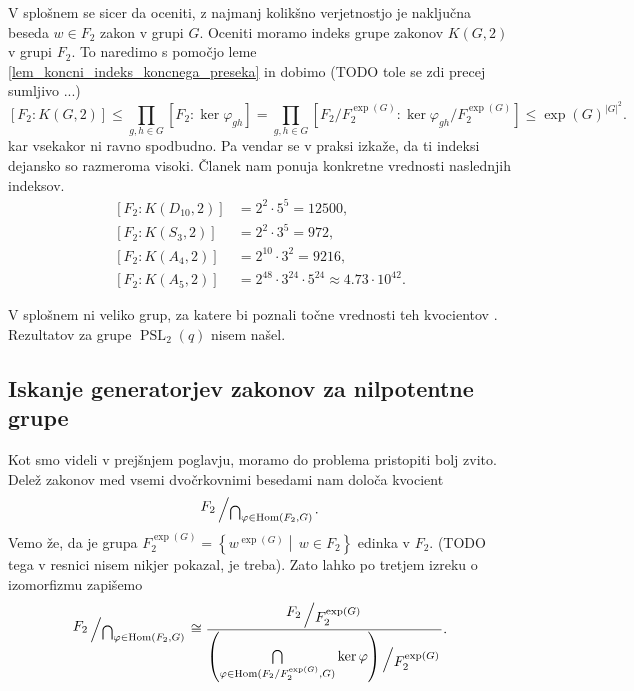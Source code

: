 \documentclass[mat1, tisk]{fmfdelo}
\newcommand{\bigslant}[2]{{\raisebox{.2em}{$#1$}\left/\raisebox{-.2em}{$#2$}\right.}}
\numberwithin{equation}{section}  %
\begin{document}
V splošnem se sicer da oceniti, z najmanj kolikšno verjetnostjo je naključna beseda $w \in F_2$ zakon v grupi $G$.
Oceniti moramo indeks grupe zakonov $K(G, 2)$ v grupi $F_2$. To naredimo s pomočjo leme \ref{lem_koncni_indeks_koncnega_preseka} in dobimo (TODO tole se zdi precej sumljivo ...)
\begin{equation*}
\left[ F_2 : K(G, 2) \right] \le \prod_{g, h \in G} [F_2 : \ker \varphi_{gh}] = \prod_{g, h \in G} [F_2 / F_2^{\exp(G)} : \ker \varphi_{gh}  / F_2^{\exp(G)}] \le {\exp(G)}^{\lvert G \rvert^2}.
\end{equation*}  
kar vsekakor ni ravno spodbudno. Pa vendar se v praksi izkaže, da ti indeksi dejansko so razmeroma visoki. Članek \cite{Cocke_2020} nam ponuja konkretne vrednosti naslednjih indeksov.
\begin{align*}
    \left[ F_2 : K(D_{10}, 2) \right] &= 2^2 \cdot 5^{5} = 12500, \\
    \left[ F_2 : K(S_3, 2) \right] &= 2^2 \cdot 3^{5} = 972, \\
    \left[ F_2 : K(A_4, 2) \right] &= 2^{10} \cdot  3^{2} = 9216, \\
    \left[ F_2 : K(A_5, 2) \right] &= 2^{48} \cdot  3^{24} \cdot 5^{24} \approx 4.73 \cdot 10^{42}.   %
\end{align*}

V splošnem ni veliko grup, za katere bi poznali točne vrednosti teh kvocientov \cite[str.~1]{Cocke_2020}. Rezultatov za grupe $\operatorname{PSL}_2(q)$ nisem našel.

\subsection{Iskanje generatorjev zakonov za nilpotentne grupe}

Kot smo videli v prejšnjem poglavju, moramo do problema pristopiti bolj zvito. Delež zakonov med vsemi dvočrkovnimi besedami nam določa kvocient \begin{equation*}
\bigslant{F_2}{\bigcap_{\varphi \in \operatorname{Hom}(F_2, G)}}.  
\end{equation*}  
Vemo že, da je grupa $F_2^{\exp(G)} = \left\{ w^{\exp(G)}  \middle|\, w \in F_2 \right\}$ edinka v $F_2$. (TODO tega v resnici nisem nikjer pokazal, je treba).
Zato lahko po tretjem izreku o izomorfizmu zapišemo 
\begin{equation*}
    \bigslant{F_2}{\bigcap_{\varphi \in \operatorname{Hom}(F_2, G)}} \cong \dfrac{\bigslant{F_2}{F_2^{\exp(G)}}}{\bigslant{ \left( \bigcap\limits_{\varphi \in \operatorname{Hom}({F_2} / {F_2^{\exp(G)}}, G)} \ker \varphi \right) }{F_2^{\exp(G)}}}.
\end{equation*}  
  
\end{document}

